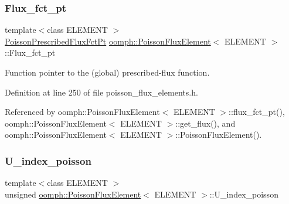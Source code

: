 \mbox{\label{classoomph_1_1PoissonFluxElement_ad737032d93200748f1c48e22c2cc0e9b}} 
\subsubsection{\texorpdfstring{Flux\+\_\+fct\+\_\+pt}{Flux\_fct\_pt}}
{\footnotesize\ttfamily template$<$class E\+L\+E\+M\+E\+NT $>$ \\
\hyperlink{classoomph_1_1PoissonFluxElement_a667254e1d7fea39ba393e0d9853f216d}{Poisson\+Prescribed\+Flux\+Fct\+Pt} \hyperlink{classoomph_1_1PoissonFluxElement}{oomph\+::\+Poisson\+Flux\+Element}$<$ E\+L\+E\+M\+E\+NT $>$\+::Flux\+\_\+fct\+\_\+pt\hspace{0.3cm}{\ttfamily [private]}}



Function pointer to the (global) prescribed-\/flux function. 



Definition at line 250 of file poisson\+\_\+flux\+\_\+elements.\+h.



Referenced by oomph\+::\+Poisson\+Flux\+Element$<$ E\+L\+E\+M\+E\+N\+T $>$\+::flux\+\_\+fct\+\_\+pt(), oomph\+::\+Poisson\+Flux\+Element$<$ E\+L\+E\+M\+E\+N\+T $>$\+::get\+\_\+flux(), and oomph\+::\+Poisson\+Flux\+Element$<$ E\+L\+E\+M\+E\+N\+T $>$\+::\+Poisson\+Flux\+Element().

\mbox{\label{classoomph_1_1PoissonFluxElement_ab504c339a71a90ae4975071368b1f84c}} 
\subsubsection{\texorpdfstring{U\+\_\+index\+\_\+poisson}{U\_index\_poisson}}
{\footnotesize\ttfamily template$<$class E\+L\+E\+M\+E\+NT $>$ \\
unsigned \hyperlink{classoomph_1_1PoissonFluxElement}{oomph\+::\+Poisson\+Flux\+Element}$<$ E\+L\+E\+M\+E\+NT $>$\+::U\+\_\+index\+\_\+poisson\hspace{0.3cm}{\ttfamily [private]}}



